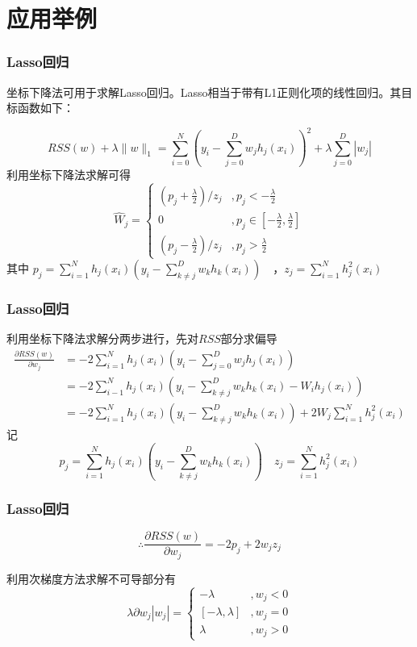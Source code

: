 \documentclass[10pt]{beamer}
\begin{document}
\section{应用举例}
\begin{frame}
\frametitle{Lasso回归}
坐标下降法可用于求解Lasso回归。Lasso相当于带有L1正则化项的线性回归。其目标函数如下：

$$
R S S(w)+\lambda\|w\|_{1}=\sum_{i=0}^{N}\left(y_{i}-\sum_{j=0}^{D} w_{j} h_{j}\left(x_{i}\right)\right)^{2}+\lambda \sum_{j=0}^{D}\left|w_{j}\right|
$$
利用坐标下降法求解可得
$$
\hat{W}_{j}=\left\{\begin{array}{ll}
\left(p_{j}+\frac{\lambda}{2}\right) / z_{j} & , p_{j}<-\frac{\lambda}{2} \\
0 & , p_{j} \in\left[-\frac{\lambda}{2}, \frac{\lambda}{2}\right] \\
\left(p_{j}-\frac{\lambda}{2}\right) / z_{j} &, p_{j}>\frac{\lambda}{2}
\end{array}\right.
$$
其中 $p_{j}=\sum_{i=1}^{N} h_{j}\left(x_{i}\right)\left(y_{i}-\sum_{k \neq j}^{D} w_{k} h_{k}\left(x_{i}\right)\right) \quad$，$z_{j}=\sum_{i=1}^{N} h_{j}^{2}\left(x_{i}\right)$
\end{frame}
\begin{frame}
	\frametitle{Lasso回归}
利用坐标下降法求解分两步进行，先对$RSS$部分求偏导
$$
\begin{aligned}
\frac{\partial RSS(w)}{\partial w_{j}} &=-2 \sum_{i=1}^{N} h_{j}\left(x_{i}\right)\left(y_{i}-\sum_{j=0}^{D} w_{j} h_{j}\left(x_{i}\right)\right) \\
&=-2 \sum_{i-1}^{N} h_{j}(x_{i})\left(y_{i}-\sum_{k \neq j}^{D} w_{k} h_{k}\left(x_{i}\right)-W_{i} h_{j}\left(x_{i}\right)\right) \\
&=-2 \sum_{i=1}^{N} h_{j}\left(x_{i}\right)\left(y_{i}-\sum_{k\neq j}^{D} w_{k} h_{k}\left(x_{i}\right)\right)+2 W_{j} \sum_{i=1}^{N} h_{j}^{2}\left(x_{i}\right)
\end{aligned}
$$
记\\
$$
p_{j}=\sum_{i=1}^{N} h_{j}\left(x_{i}\right)\left(y_{i}-\sum_{k \neq j}^{D}w_{k} h_{k}\left(x_{i}\right)\right) \quad z_{j}=\sum_{i=1}^{N} h_{j}^{2}\left(x_{i}\right)
$$
\end{frame}

\begin{frame}
	\frametitle{Lasso回归}
$$
	\therefore \frac{\partial RSS(w)}{\partial w_{j}}=-2 p_{j}+2 w_{j} z_{j}
$$


	利用次梯度方法求解不可导部分有\\
	$$
	\lambda \partial w_{j}\left|w_{j}\right|=\left\{\begin{array}{cl}
		-\lambda & , w_{j}<0 \\
		{[-\lambda, \lambda]} & , w_{j}=0 \\
		\lambda & , w_{j}>0
	\end{array}\right.
    $$
\end{frame}
\end{document}
